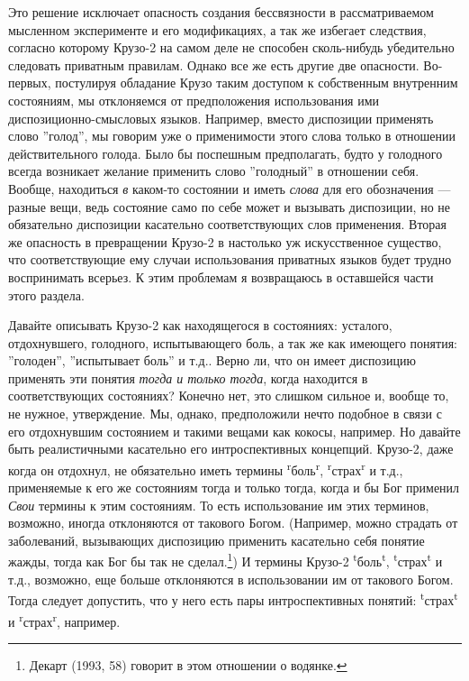 \documentclass[11pt]{book}
\begin{document}
Это решение исключает опасность создания бессвязности в рассматриваемом мысленном эксперименте и его модификациях, а так же избегает следствия, согласно которому Крузо-2 на самом деле не способен сколь-нибудь убедительно следовать приватным правилам. Однако все же есть другие две опасности. Во-первых, постулируя обладание Крузо таким доступом к собственным внутренним состояниям, мы отклоняемся от предположения использования ими диспозиционно-смысловых языков. Например, вместо диспозиции применять слово ''голод'', мы говорим уже о применимости этого слова только в отношении действительного голода. Было бы поспешным предполагать, будто у голодного всегда возникает желание применить слово ''голодный'' в отношении себя. Вообще, находиться \textit{в} каком-то состоянии и иметь \textit{слова} для его обозначения --- разные вещи, ведь состояние само по себе может и вызывать диспозиции, но не обязательно диспозиции касательно соответствующих слов применения. Вторая же опасность в превращении Крузо-2 в настолько уж искусственное существо, что соответствующие ему случаи использования приватных языков будет трудно воспринимать всерьез. К этим проблемам я возвращаюсь в оставшейся части этого раздела.

Давайте описывать Крузо-2 как находящегося в состояниях: усталого, отдохнувшего, голодного, испытывающего боль, а так же как имеющего понятия: ''голоден'', ''испытывает боль'' и т.д.. Верно ли, что он имеет диспозицию применять эти понятия \textit{тогда и только тогда}, когда находится в соответствующих состояниях? Конечно нет, это слишком сильное и, вообще то, не нужное, утверждение. Мы, однако, предположили нечто подобное в связи с его отдохнувшим состоянием и такими вещами как кокосы, например. Но давайте быть реалистичными касательно его интроспективных концепций. Крузо-2, даже когда он отдохнул, не обязательно иметь термины \textsuperscript{r}боль\textsuperscript{r}, \textsuperscript{r}страх\textsuperscript{r} и т.д., применяемые к его же состояниям тогда и только тогда, когда и бы Бог применил \textit{Свои} термины к этим состояниям. То есть использование им этих терминов, возможно, иногда отклоняются от такового Богом. (Например, можно страдать от заболеваний, вызывающих диспозицию применить касательно себя понятие жажды, тогда как Бог бы так не сделал.\footnote{Декарт (1993, 58) говорит в этом отношении о водянке.}) И термины Крузо-2 \textsuperscript{t}боль\textsuperscript{t}, \textsuperscript{t}страх\textsuperscript{t} и т.д., возможно, еще больше отклоняются в использовании им от такового Богом. Тогда следует допустить, что у него есть пары интроспективных понятий: \textsuperscript{t}страх\textsuperscript{t} и \textsuperscript{r}страх\textsuperscript{r}, например.
\end{document}
